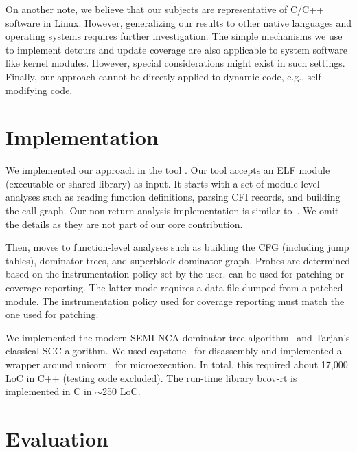 On another note, we believe that our subjects are representative of C/C++ software in Linux.
However, generalizing our results to other native languages and operating systems requires further investigation.
The simple mechanisms we use to implement detours and update coverage are also applicable to system software like kernel modules. 
However, special considerations might exist in such settings.
Finally, our approach cannot be directly applied to dynamic code, e.g., self-modifying code.



\section{Implementation}

We implemented our approach in the tool {\bcov}.
Our tool accepts an ELF module (executable or shared library) as input.
It starts with a set of module-level analyses such as reading function definitions, parsing CFI records, and building the call graph.
Our non-return analysis implementation is similar to~\cite{Meng:ISSTA2016}.
We omit the details as they are not part of our core contribution.

Then, {\bcov} moves to function-level analyses such as building the CFG (including jump tables), dominator trees, and superblock dominator graph.
Probes are determined based on the instrumentation policy set by the user.
{\bcov} can be used for patching or coverage reporting.
The latter mode requires a data file dumped from a patched module.
The instrumentation policy used for coverage reporting must match the one used for patching. 

We implemented the modern SEMI-NCA dominator tree algorithm~\cite{Georgiadis2005} and Tarjan's classical SCC algorithm.
We used \textsf{capstone}~\cite{CapstoneEngine} for disassembly and implemented a wrapper around \textsf{unicorn}~\cite{UnicornEngine} for microexecution.
In total, this required about 17,000 LoC in C++ (testing code excluded).
The run-time library \textsf{bcov-rt} is implemented in C in $\sim$250 LoC.


\section{Evaluation}
\label{sec:evaluation}

